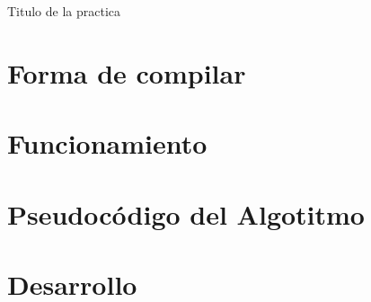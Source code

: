 \documentclass[a4paper,12pt]{article}
\begin{document}

\newpage



\newpage

\begin{center}
    {\Large Titulo de la practica}
\end{center}

\section*{Forma de compilar}

\section*{Funcionamiento}

\section*{Pseudocódigo del Algotitmo}
    

\section*{Desarrollo}
\end{document}
